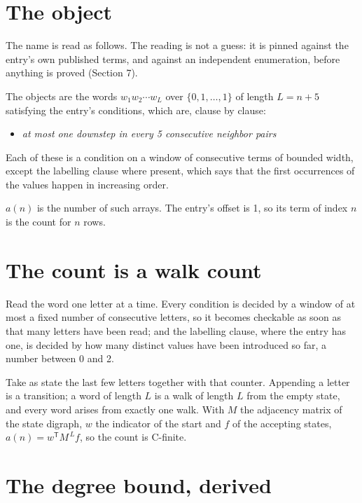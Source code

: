 \documentclass[11pt]{article}
\theoremstyle{definition}
\begin{document}
\section{The object}

The name is read as follows. The reading is not a guess: it is pinned against the entry's own published terms, and against an independent enumeration, before anything is proved (Section 7).

The objects are the words $w_1 w_2 \cdots w_L$ over $\{0,1,\dots,1\}$ of length $L = n + 5$ satisfying the entry's conditions, which are, clause by clause:

\begin{itemize}

\item {\itshape at most one downstep in every 5 consecutive neighbor pairs}

\end{itemize}

Each of these is a condition on a window of consecutive terms of bounded width, except the labelling clause where present, which says that the first occurrences of the values happen in increasing order.

$a(n)$ is the number of such arrays. The entry's offset is 1, so its term of index $n$ is the count for $n$ rows.

\section{The count is a walk count}

Read the word one letter at a time. Every condition is decided by a window of at most a fixed number of consecutive letters, so it becomes checkable as soon as that many letters have been read; and the labelling clause, where the entry has one, is decided by how many distinct values have been introduced so far, a number between $0$ and 2.

Take as state the last few letters together with that counter. Appending a letter is a transition; a word of length $L$ is a walk of length $L$ from the empty state, and every word arises from exactly one walk. With $M$ the adjacency matrix of the state digraph, $w$ the indicator of the start and $f$ of the accepting states, $a(n) = w^{\mathsf T}M^{\,L}f$, so the count is C-finite.

\section{The degree bound, derived}
\end{document}
